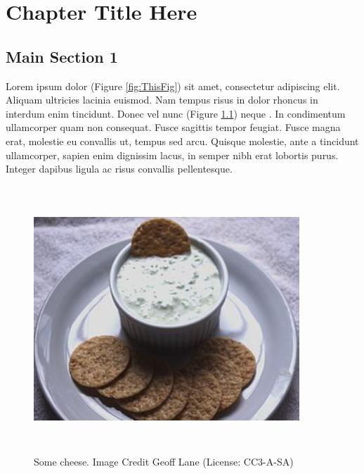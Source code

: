 
\chapter{Chapter Title Here}\label{chapter:firstchapter} %

\label{ChapterX} %


\section{Main Section 1}\label{sec:firstsection}

Lorem ipsum dolor (Figure \ref{fig:ThisFig}) sit amet, consectetur adipiscing elit\cite{fleischman1994pragmatics}.
Aliquam ultricies lacinia euismod.
Nam tempus risus in dolor rhoncus in interdum enim tincidunt.
Donec vel nunc (Figure \ref{fig:CheeseFig}) neque \cite{lawless1995multidimensional}.
In condimentum ullamcorper quam non consequat.
Fusce sagittis tempor feugiat.
Fusce magna erat, molestie eu convallis ut, tempus sed arcu.
Quisque molestie, ante a tincidunt ullamcorper, sapien enim dignissim lacus, in semper nibh erat lobortis purus.
Integer dapibus ligula ac risus convallis pellentesque.


\begin{figure}
\begin{centering}
\includegraphics[width=10cm,height=10cm,keepaspectratio]{Figures/cheese.jpg}
\caption{Some cheese. Image Credit Geoff Lane (License: CC3-A-SA)}
\label{fig:CheeseFig}
\end{centering}
\end{figure}


